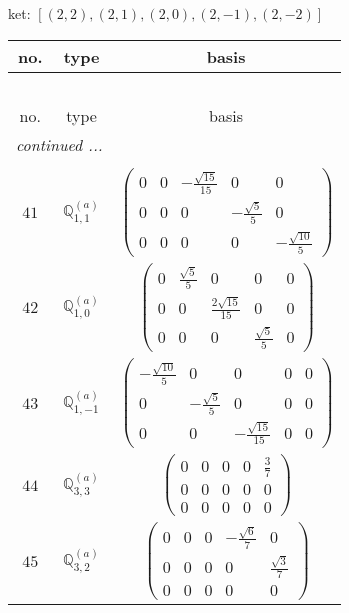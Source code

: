 \documentclass[fleqn,8pt,landscape]{jsarticle}
\begin{document}
\noindent
ket: $[(2,2),(2,1),(2,0),(2,-1),(2,-2)]$
\begin{center}
\renewcommand{\arraystretch}{1.6}
\begin{longtable}{ccc}
 \hline \hline
no. & type & basis \\ \hline \endfirsthead

\multicolumn{2}{l}{\tablename\ \thetable{}} \\
 \hline \hline
no. & type & basis \\ \hline \endhead

 \hline \hline
\multicolumn{2}{r}{\footnotesize\it continued ...} \\ \endfoot

 \hline \hline
\multicolumn{2}{r}{} \\ \endlastfoot

$ 41 $ & $ \mathbb{Q}_{1,1}^{(a)} $ & $ \begin{pmatrix} 0 & 0 & - \frac{\sqrt{15}}{15} & 0 & 0 \\ 0 & 0 & 0 & - \frac{\sqrt{5}}{5} & 0 \\ 0 & 0 & 0 & 0 & - \frac{\sqrt{10}}{5} \end{pmatrix} $ \\ \hline
$ 42 $ & $ \mathbb{Q}_{1,0}^{(a)} $ & $ \begin{pmatrix} 0 & \frac{\sqrt{5}}{5} & 0 & 0 & 0 \\ 0 & 0 & \frac{2 \sqrt{15}}{15} & 0 & 0 \\ 0 & 0 & 0 & \frac{\sqrt{5}}{5} & 0 \end{pmatrix} $ \\ \hline
$ 43 $ & $ \mathbb{Q}_{1,-1}^{(a)} $ & $ \begin{pmatrix} - \frac{\sqrt{10}}{5} & 0 & 0 & 0 & 0 \\ 0 & - \frac{\sqrt{5}}{5} & 0 & 0 & 0 \\ 0 & 0 & - \frac{\sqrt{15}}{15} & 0 & 0 \end{pmatrix} $ \\ \hline
$ 44 $ & $ \mathbb{Q}_{3,3}^{(a)} $ & $ \begin{pmatrix} 0 & 0 & 0 & 0 & \frac{3}{7} \\ 0 & 0 & 0 & 0 & 0 \\ 0 & 0 & 0 & 0 & 0 \end{pmatrix} $ \\ \hline
$ 45 $ & $ \mathbb{Q}_{3,2}^{(a)} $ & $ \begin{pmatrix} 0 & 0 & 0 & - \frac{\sqrt{6}}{7} & 0 \\ 0 & 0 & 0 & 0 & \frac{\sqrt{3}}{7} \\ 0 & 0 & 0 & 0 & 0 \end{pmatrix} $ \\ \hline

\end{longtable}
\end{center}
\end{document}

